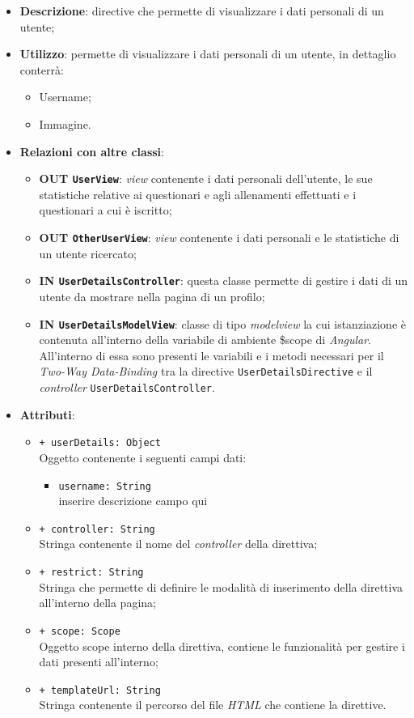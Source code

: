 \begin{itemize}
	\item \textbf{Descrizione}: directive che permette di visualizzare i dati personali di un utente;
	\item \textbf{Utilizzo}: permette di visualizzare i dati personali di un utente, in dettaglio conterrà:
	\begin{itemize}
		\item Username;
		\item Immagine.
	\end{itemize}
	\item \textbf{Relazioni con altre classi}:
	\begin{itemize}
		\item \textbf{OUT \texttt{UserView}}: \textit{view} contenente i dati personali dell'utente, le sue statistiche relative ai questionari e agli allenamenti effettuati e i questionari a cui è iscritto;
		\item \textbf{OUT \texttt{OtherUserView}}: \textit{view} contenente i dati personali e le statistiche di un utente ricercato;
		\item \textbf{IN \texttt{UserDetailsController}}: questa classe permette di gestire i dati di un utente da mostrare nella pagina di un profilo;
		\item \textbf{IN \texttt{UserDetailsModelView}}: classe di tipo \textit{modelview} la cui istanziazione è contenuta all'interno della variabile di ambiente \$scope di \textit{Angular}. All'interno di essa sono presenti le variabili e i metodi necessari per il \textit{Two-Way Data-Binding} tra la directive \texttt{UserDetailsDirective} e il \textit{controller} \texttt{UserDetailsController}.
	\end{itemize}
	\item \textbf{Attributi}:
	\begin{itemize}
		\item \texttt{+ userDetails: Object} \\ Oggetto contenente i seguenti campi dati:
		\begin{itemize}
			\item \texttt{username: String} \\
			inserire descrizione campo qui
		\end{itemize}
		\item \texttt{+ controller: String} \\ Stringa contenente il nome del \textit{controller} della direttiva;
		\item \texttt{+ restrict: String} \\ Stringa che permette di definire le modalità di inserimento della direttiva all'interno della pagina;
		\item \texttt{+ scope: Scope} \\ Oggetto scope interno della direttiva, contiene le funzionalità per gestire i dati presenti all'interno;
		\item \texttt{+ templateUrl: String} \\ Stringa contenente il percorso del file \textit{HTML} che contiene la direttive.
	\end{itemize}
\end{itemize}